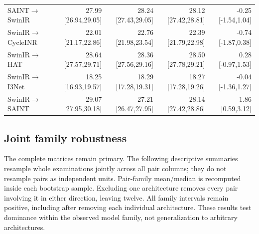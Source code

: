 \begin{table}[t]
\begin{tabular}{lrrrr}
SAINT$\to$SwinIR & 27.99 [26.94,29.05] & 28.24 [27.43,29.05] & 28.12 [27.42,28.81] & -0.25 [-1.54,1.04] \\
SwinIR$\to$CycleINR & 22.01 [21.17,22.86] & 22.76 [21.98,23.54] & 22.39 [21.79,22.98] & -0.74 [-1.87,0.38] \\
SwinIR$\to$HAT & 28.64 [27.57,29.71] & 28.36 [27.56,29.16] & 28.50 [27.78,29.21] & 0.28 [-0.97,1.53] \\
SwinIR$\to$I3Net & 18.25 [16.93,19.57] & 18.29 [17.28,19.31] & 18.27 [17.28,19.26] & -0.04 [-1.36,1.27] \\
SwinIR$\to$SAINT & 29.07 [27.95,30.18] & 27.21 [26.47,27.95] & 28.14 [27.42,28.86] & 1.86 [0.59,3.12] \\\bottomrule\end{tabular}\end{table}
\subsection{Joint family robustness}
The complete matrices remain primary. The following descriptive summaries resample whole examinations jointly across all pair columns; they do not resample pairs as independent units. Pair-family mean/median is recomputed inside each bootstrap sample. Excluding one architecture removes every pair involving it in either direction, leaving twelve. All family intervals remain positive, including after removing each individual architecture. These results test dominance within the observed model family, not generalization to arbitrary architectures.
